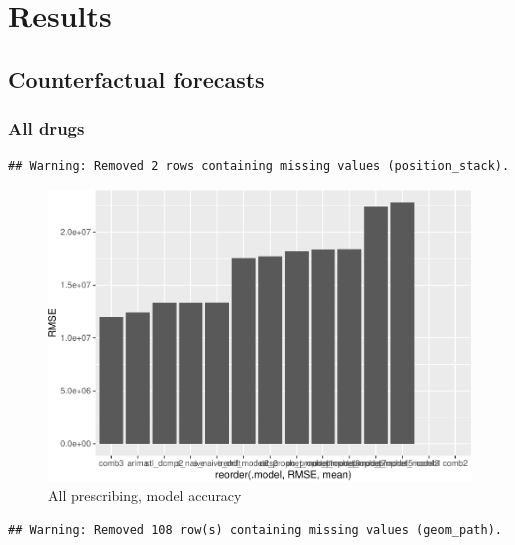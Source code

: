 \documentclass[
  english,
  man,floatsintext]{apa7}
\begin{document}
\hypertarget{results}{%
\section{Results}\label{results}}

\hypertarget{counterfactual-forecasts}{%
\subsection{Counterfactual forecasts}\label{counterfactual-forecasts}}

\hypertarget{all-drugs}{%
\subsubsection{All drugs}\label{all-drugs}}

\begin{verbatim}
## Warning: Removed 2 rows containing missing values (position_stack).
\end{verbatim}

\begin{figure}
\centering
\includegraphics{paper_files/figure-latex/all-prescribing-model-accuracy-hist-1.pdf}
\caption{\label{fig:all-prescribing-model-accuracy-hist}All prescribing, model accuracy}
\end{figure}

\begin{verbatim}
## Warning: Removed 108 row(s) containing missing values (geom_path).
\end{verbatim}
\end{document}
